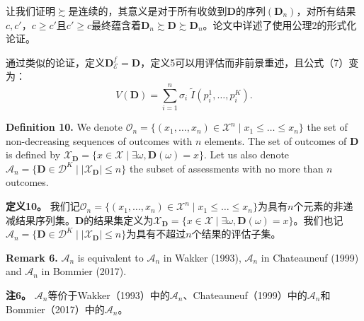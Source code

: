 \documentclass[12pt,a4paper]{article}
\newenvironment{original}
  {\par\noindent\ignorespaces}
  {\par}
\newenvironment{translation}
  {\par\noindent{\color{transblue}\ignorespaces}}
  {\par\medskip}
\begin{document}
\begin{translation}
让我们证明$\succsim$是连续的，其意义是对于所有收敛到$\mathbf{D}$的序列$(\mathbf{D}_{n})$，对所有结果$c, c'$，$c \geq c'$且$c' \geq c$最终蕴含着$\mathbf{D}_{n} \succsim \mathbf{D} \succsim \mathbf{D}_{n}$。论文中详述了使用公理2的形式化论证。

通过类似的论证，定义$\mathbf{D}_{\mathcal{E}}^{f} = \mathbf{D}$，定义5可以用评估而非前景重述，且公式（7）变为：
\[
V(\mathbf{D}) = \sum_{i=1}^{n} \sigma_{i} \; \tilde{I}(p^{1}_{i}, \dots, p^{K}_{i}). \tag{D.1}
\]
\end{translation}

\begin{original}
\textbf{Definition 10.} We denote $\mathcal{O}_{n} = \{(x_{1}, \dots, x_{n}) \in \mathcal{X}^{n} \mid x_{1} \leq \dots \leq x_{n}\}$ the set of non-decreasing sequences of outcomes with $n$ elements. The set of outcomes of $\mathbf{D}$ is defined by $\mathcal{X}_{\mathbf{D}} = \{x \in \mathcal{X} \mid \exists \omega, \mathbf{D}(\omega) = x\}$. Let us also denote $\mathcal{A}_{n} = \{\mathbf{D} \in \mathcal{D}^{K} \mid |\mathcal{X}_{\mathbf{D}}| \leq n\}$ the subset of assessments with no more than $n$ outcomes.
\end{original}

\begin{translation}
\textbf{定义10。} 我们记$\mathcal{O}_{n} = \{(x_{1}, \dots, x_{n}) \in \mathcal{X}^{n} \mid x_{1} \leq \dots \leq x_{n}\}$为具有$n$个元素的非递减结果序列集。$\mathbf{D}$的结果集定义为$\mathcal{X}_{\mathbf{D}} = \{x \in \mathcal{X} \mid \exists \omega, \mathbf{D}(\omega) = x\}$。我们也记$\mathcal{A}_{n} = \{\mathbf{D} \in \mathcal{D}^{K} \mid |\mathcal{X}_{\mathbf{D}}| \leq n\}$为具有不超过$n$个结果的评估子集。
\end{translation}

\begin{original}
\textbf{Remark 6.} $\mathcal{A}_{n}$ is equivalent to $\mathcal{A}_{n}$ in Wakker (1993), $\mathcal{A}_{n}$ in Chateauneuf (1999) and $\mathcal{A}_{n}$ in Bommier (2017).
\end{original}

\begin{translation}
\textbf{注6。} $\mathcal{A}_{n}$等价于Wakker（1993）中的$\mathcal{A}_{n}$、Chateauneuf（1999）中的$\mathcal{A}_{n}$和Bommier（2017）中的$\mathcal{A}_{n}$。
\end{translation}
\end{document}
